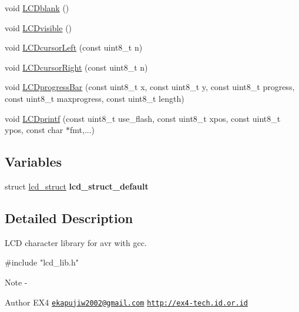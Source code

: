 \begin{DoxyCompactItemize}
\item 
void \hyperlink{group__ex4__lcd_ga239e0192768dab01ffdfa81303fd294f}{L\-C\-Dblank} ()
\item 
void \hyperlink{group__ex4__lcd_ga8a720f0c43007e6f77df06f1f8d35806}{L\-C\-Dvisible} ()
\item 
void \hyperlink{group__ex4__lcd_ga894850f7ddadc87dfac4e11cfea348ef}{L\-C\-Dcursor\-Left} (const uint8\-\_\-t n)
\item 
void \hyperlink{group__ex4__lcd_ga4d38907bab78c36ca3fde0ad2bece2e1}{L\-C\-Dcursor\-Right} (const uint8\-\_\-t n)
\item 
void \hyperlink{group__ex4__lcd_gaede0b2008c99ed42726c7f2a05be4b68}{L\-C\-Dprogress\-Bar} (const uint8\-\_\-t x, const uint8\-\_\-t y, const uint8\-\_\-t progress, const uint8\-\_\-t maxprogress, const uint8\-\_\-t length)
\item 
void \hyperlink{group__ex4__lcd_gac5178c0922f0bbb88f2e763c58901075}{L\-C\-Dprintf} (const uint8\-\_\-t use\-\_\-flash, const uint8\-\_\-t xpos, const uint8\-\_\-t ypos, const char $\ast$fmt,...)
\end{DoxyCompactItemize}
\subsection*{Variables}
\begin{DoxyCompactItemize}
\item 
\hypertarget{group__ex4__lcd_gacc3964e16db84ad2659578e8735667f8}{struct \hyperlink{structlcd__struct}{lcd\-\_\-struct} {\bfseries lcd\-\_\-struct\-\_\-default}}\label{group__ex4__lcd_gacc3964e16db84ad2659578e8735667f8}

\end{DoxyCompactItemize}


\subsection{Detailed Description}
L\-C\-D character library for avr with gcc. 
\begin{DoxyCode}
\textcolor{preprocessor}{ #include "lcd\_lib.h"} 
\end{DoxyCode}


\begin{DoxyNote}{Note}
-\/ 
\end{DoxyNote}
\begin{DoxyAuthor}{Author}
E\-X4 \href{mailto:ekapujiw2002@gmail.com}{\tt ekapujiw2002@gmail.\-com} \href{http://ex4-tech.id.or.id}{\tt http\-://ex4-\/tech.\-id.\-or.\-id} 
\end{DoxyAuthor}


